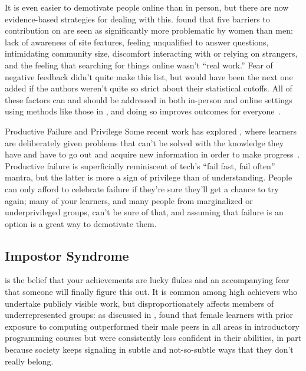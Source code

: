 It is even easier to demotivate people online than in person,
but there are now evidence-based strategies for dealing with this.
\cite{Ford2016} found that five barriers to contribution on 
are seen as significantly more problematic by women than men:
lack of awareness of site features,
feeling unqualified to answer questions,
intimidating community size,
discomfort interacting with or relying on strangers,
and the feeling that searching for things online wasn't ``real work.''
Fear of negative feedback didn't quite make this list,
but would have been the next one added if the authors weren't quite so strict about their statistical cutoffs.
All of these factors can and should be addressed in both in-person and online settings
using methods like those in ,
and doing so improves outcomes for everyone~\cite{Sved2016}.

\begin{aside}{Productive Failure and Privilege}
  Some recent work has explored ,
  where learners are deliberately given problems that can't be solved with the knowledge they have
  and have to go out and acquire new information in order to make progress~\cite{Kapu2016}.
  Productive failure is superficially reminiscent of tech's ``fail fast, fail often'' mantra,
  but the latter is more a sign of privilege than of understanding.
  People can only afford to celebrate failure if they're sure they'll get a chance to try again;
  many of your learners,
  and many people from marginalized or underprivileged groups,
  can't be sure of that,
  and assuming that failure is an option is a great way to demotivate them.
\end{aside}

\subsection*{Impostor Syndrome}

is the belief that your achievements are lucky flukes
and an accompanying fear that someone will finally figure this out.
It is common among high achievers who undertake publicly visible work,
but disproportionately affects members of underrepresented groups:
as discussed in ,
\cite{Wilc2018} found that
female learners with prior exposure to computing outperformed their male peers in all areas in introductory programming courses
but were consistently less confident in their abilities,
in part because society keeps signaling in subtle and not-so-subtle ways
that they don't really belong.

